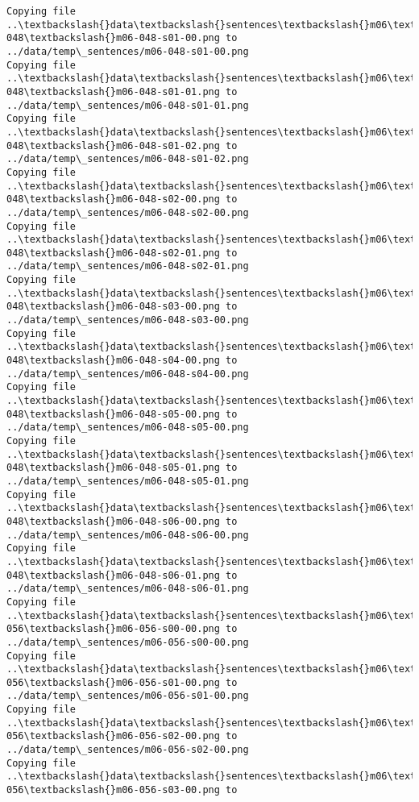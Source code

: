 \documentclass[11pt]{article}
\begin{document}
\begin{Verbatim}[commandchars=\\\{\}]
Copying file ..\textbackslash{}data\textbackslash{}sentences\textbackslash{}m06\textbackslash{}m06-048\textbackslash{}m06-048-s01-00.png to
../data/temp\_sentences/m06-048-s01-00.png
Copying file ..\textbackslash{}data\textbackslash{}sentences\textbackslash{}m06\textbackslash{}m06-048\textbackslash{}m06-048-s01-01.png to
../data/temp\_sentences/m06-048-s01-01.png
Copying file ..\textbackslash{}data\textbackslash{}sentences\textbackslash{}m06\textbackslash{}m06-048\textbackslash{}m06-048-s01-02.png to
../data/temp\_sentences/m06-048-s01-02.png
Copying file ..\textbackslash{}data\textbackslash{}sentences\textbackslash{}m06\textbackslash{}m06-048\textbackslash{}m06-048-s02-00.png to
../data/temp\_sentences/m06-048-s02-00.png
Copying file ..\textbackslash{}data\textbackslash{}sentences\textbackslash{}m06\textbackslash{}m06-048\textbackslash{}m06-048-s02-01.png to
../data/temp\_sentences/m06-048-s02-01.png
Copying file ..\textbackslash{}data\textbackslash{}sentences\textbackslash{}m06\textbackslash{}m06-048\textbackslash{}m06-048-s03-00.png to
../data/temp\_sentences/m06-048-s03-00.png
Copying file ..\textbackslash{}data\textbackslash{}sentences\textbackslash{}m06\textbackslash{}m06-048\textbackslash{}m06-048-s04-00.png to
../data/temp\_sentences/m06-048-s04-00.png
Copying file ..\textbackslash{}data\textbackslash{}sentences\textbackslash{}m06\textbackslash{}m06-048\textbackslash{}m06-048-s05-00.png to
../data/temp\_sentences/m06-048-s05-00.png
Copying file ..\textbackslash{}data\textbackslash{}sentences\textbackslash{}m06\textbackslash{}m06-048\textbackslash{}m06-048-s05-01.png to
../data/temp\_sentences/m06-048-s05-01.png
Copying file ..\textbackslash{}data\textbackslash{}sentences\textbackslash{}m06\textbackslash{}m06-048\textbackslash{}m06-048-s06-00.png to
../data/temp\_sentences/m06-048-s06-00.png
Copying file ..\textbackslash{}data\textbackslash{}sentences\textbackslash{}m06\textbackslash{}m06-048\textbackslash{}m06-048-s06-01.png to
../data/temp\_sentences/m06-048-s06-01.png
Copying file ..\textbackslash{}data\textbackslash{}sentences\textbackslash{}m06\textbackslash{}m06-056\textbackslash{}m06-056-s00-00.png to
../data/temp\_sentences/m06-056-s00-00.png
Copying file ..\textbackslash{}data\textbackslash{}sentences\textbackslash{}m06\textbackslash{}m06-056\textbackslash{}m06-056-s01-00.png to
../data/temp\_sentences/m06-056-s01-00.png
Copying file ..\textbackslash{}data\textbackslash{}sentences\textbackslash{}m06\textbackslash{}m06-056\textbackslash{}m06-056-s02-00.png to
../data/temp\_sentences/m06-056-s02-00.png
Copying file ..\textbackslash{}data\textbackslash{}sentences\textbackslash{}m06\textbackslash{}m06-056\textbackslash{}m06-056-s03-00.png to

\end{Verbatim}
\end{document}
